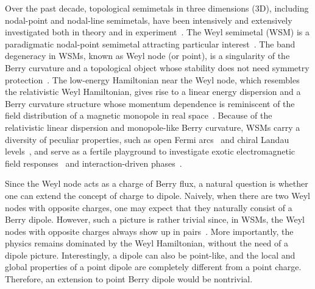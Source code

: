\documentclass[aps,prl,twocolumn,longbibliography]{revtex4-1}
\begin{document}
Over the past decade,  topological semimetals in three dimensions (3D),
including nodal-point and nodal-line semimetals,  have been intensively and
extensively investigated both in theory
and in experiment~\cite{Yan2016review,Burkov2016,Armitage2018RMP,Lv2021RMP,Nagaosa2020,Hasan2021}.
The Weyl semimetal (WSM) is a paradigmatic nodal-point semimetal attracting particular
interest~\cite{wan2011,Xu2011weyl,burkov2011,Weng2015weyl,Lv2015weyl,Xu2015weyl,Huang2015weyl,Zhang2016weyl}. The band degeneracy in WSMs, known as Weyl node (or point),
is a singularity of the Berry curvature and
a topological object whose stability does not need symmetry protection~\cite{Volovik2001review}.
The low-energy
Hamiltonian near the Weyl node, which resembles the
relativistic Weyl Hamiltonian, gives rise to a linear
energy dispersion and a Berry curvature structure whose
momentum dependence is reminiscent of the field distribution of a magnetic monopole in real
space~\cite{Berry1984,volovik1987zeros}. Because of the relativistic linear dispersion and monopole-like Berry curvature,
WSMs carry a diversity of peculiar properties, such as
open Fermi arcs~\cite{wan2011} and chiral Landau levels~\cite{Yuan2018,Jia2019chiral}, and serve as a fertile playground
to investigate exotic electromagnetic field responses~\cite{Son2012chiral,Zyuzin2012weyl,Vazifeh2013weyl,Nandy2017planar,deJuan2017,Yuan2020,Sekine2021axion} and interaction-driven phases~\cite{Cho2012,wang2013a,Roy2017weyl}.

Since the Weyl node acts as a charge of Berry flux, a natural question
is whether one can extend the concept of charge to dipole. Naively, when there are two Weyl nodes with opposite charges,
one may expect that they naturally consist of a Berry dipole.
However, such a picture is rather trivial since, in WSMs,  the Weyl nodes with
opposite charges always show up in pairs~\cite{Nielsen1981nogo,Nielsen1981a,Nielsen1981b}. More importantly,
the physics remains dominated by the Weyl Hamiltonian,
without the need of a dipole picture. Interestingly, a dipole
can also be point-like, and the local and global
properties of a point dipole are completely different from a point charge.
Therefore, an extension to point Berry dipole
would be nontrivial.
\end{document}
